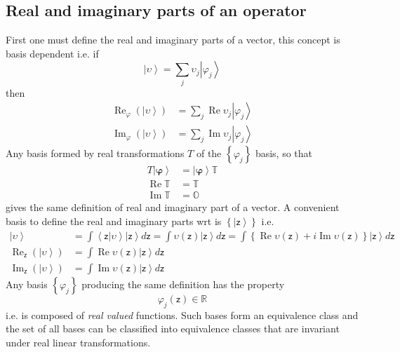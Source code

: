 \documentclass[aps,preprint]{revtex4}%
\begin{document}
\subsection{Real and imaginary parts of an operator}

First one must define the real and imaginary parts of a vector, this concept
is basis dependent i.e. if
\begin{equation}
\left\vert \upsilon\right\rangle =\sum_{j}\upsilon_{j}\left\vert \varphi
_{j}\right\rangle
\end{equation}
then
\begin{align}
\operatorname{Re}_{\varphi}\left(  \left\vert \upsilon\right\rangle \right)
&  =\sum_{j}\operatorname{Re}\upsilon_{j}\left\vert \varphi_{j}\right\rangle
\\
\operatorname{Im}_{\varphi}\left(  \left\vert \upsilon\right\rangle \right)
&  =\sum_{j}\operatorname{Im}\upsilon_{j}\left\vert \varphi_{j}\right\rangle
\end{align}
Any basis formed by real transformations $T$ of the $\left\{  \varphi
_{j}\right\}  $ basis, so that
\begin{align}
T\left\vert \mathbf{\varphi}\right\rangle  &  =\left\vert \mathbf{\varphi
}\right\rangle \mathbb{T}\nonumber\\
\operatorname{Re}\mathbb{T}  &  \mathbb{=T}\nonumber\\
\operatorname{Im}\mathbb{T}  &  \mathbb{=O}%
\end{align}
gives the same definition of real and imaginary part of a vector. A convenient
basis to define the real and imaginary parts wrt is $\left\{  \left\vert
\mathsf{z}\right\rangle \right\}  $ i.e.
\begin{align}
\left\vert \upsilon\right\rangle  &  =\int\left\langle \mathsf{z}%
|\upsilon\right\rangle \left\vert \mathsf{z}\right\rangle d\mathsf{z}%
=\int\upsilon\left(  \mathsf{z}\right)  \left\vert \mathsf{z}\right\rangle
d\mathsf{z}=\int\left\{  \operatorname{Re}\upsilon\left(  \mathsf{z}\right)
+i\operatorname{Im}\upsilon\left(  \mathsf{z}\right)  \right\}  \left\vert
\mathsf{z}\right\rangle d\mathsf{z}\nonumber\\
\operatorname{Re}_{\mathsf{z}}\left(  \left\vert \upsilon\right\rangle
\right)   &  =\int\operatorname{Re}\upsilon\left(  \mathsf{z}\right)
\left\vert \mathsf{z}\right\rangle d\mathsf{z}\nonumber\\
\operatorname{Im}_{\mathsf{z}}\left(  \left\vert \upsilon\right\rangle
\right)   &  =\int\operatorname{Im}\upsilon\left(  \mathsf{z}\right)
\left\vert \mathsf{z}\right\rangle d\mathsf{z}%
\end{align}
Any basis $\left\{  \varphi_{j}\right\}  $ producing the same definition has
the property
\begin{equation}
\varphi_{j}\left(  \mathsf{z}\right)  \in\mathbb{R}%
\end{equation}
i.e. is composed of \emph{real valued} functions. Such bases form an
equivalence class and the set of all bases can be classified into equivalence
classes that are invariant under real linear transformations.
\end{document}
